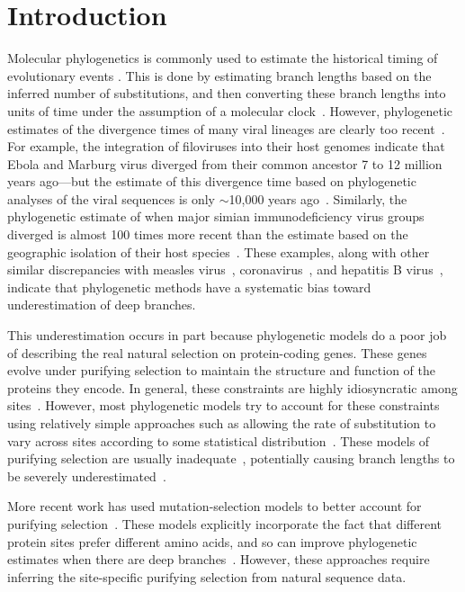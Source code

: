 \documentclass[11pt]{article}
\begin{document}
\section*{Introduction} 
Molecular phylogenetics is commonly used to estimate the historical timing of evolutionary events \citep{yang2012molecular}.
This is done by estimating branch lengths based on the inferred number of substitutions, and then converting these branch lengths into units of time under the assumption of a molecular clock~\citep{zuckerkandl1965,drummond2006relaxed}.
However, phylogenetic estimates of the divergence times of many viral lineages are clearly too recent~\citep{duchene2014analyses, ho2015time, aiewsakun2016time}.
For example, the integration of filoviruses into their host genomes indicate that Ebola and Marburg virus diverged from their common ancestor 7 to 12 million years ago---but the estimate of this divergence time based on phylogenetic analyses of the viral sequences is only $\sim$10,000 years ago~\citep{carroll2013molecular, taylor2014evidence}. 
Similarly, the phylogenetic estimate of when major simian immunodeficiency virus groups diverged is almost 100 times more recent than the estimate based on the geographic isolation of their host species~\citep{wertheim2009dating, worobey2010island}. 
These examples, along with other similar discrepancies with measles virus~\citep{furuse2010origin}, coronavirus~\citep{wertheim2013case}, and hepatitis B virus~\citep{fares2002revised, holmes2003molecular}, indicate that phylogenetic methods have a systematic bias toward underestimation of deep branches.

This underestimation occurs in part because phylogenetic models do a poor job of describing the real natural selection on protein-coding genes. 
These genes evolve under purifying selection to maintain the structure and function of the proteins they encode. 
In general, these constraints are highly idiosyncratic among sites~\citep{echave2016causes}.
However, most phylogenetic models try to account for these constraints using relatively simple approaches such as allowing the rate of substitution to vary across sites according to some statistical distribution~\citep{yang1994maximum,yang2000codon}.
These models of purifying selection are usually inadequate~\citep{duchene2015substitution, duchene2015evaluating}, potentially causing branch lengths to be severely underestimated~\citep{wertheim2011purifying, halpern1998evolutionary}.

More recent work has used mutation-selection models to better account for purifying selection~\citep{halpern1998evolutionary,yang2008mutation,rodrigue2010mutation,tamuri2012estimating,mccandlish2014modeling}.
These models explicitly incorporate the fact that different protein sites prefer different amino acids, and so can improve phylogenetic estimates when there are deep branches~\citep{philippe1998good, lartillot2007suppression, le2008phylogenetic, si2008empirical, wang2008class, susko2018accelerated}.
However, these approaches require inferring the site-specific purifying selection from natural sequence data.
\end{document}

